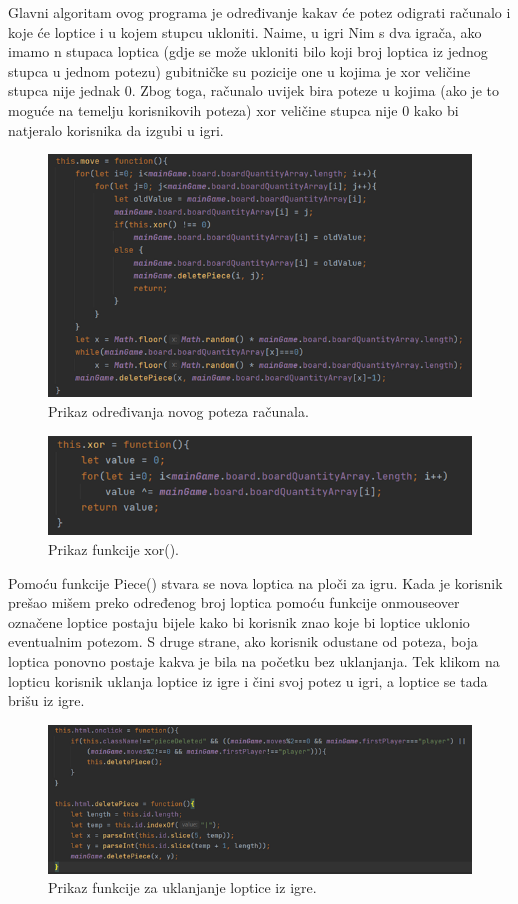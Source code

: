  


Glavni algoritam ovog programa je određivanje kakav će potez odigrati računalo i koje će loptice i u kojem stupcu ukloniti. Naime, u igri Nim s dva igrača, ako imamo n stupaca loptica (gdje se može ukloniti bilo koji broj loptica iz jednog stupca u jednom potezu) gubitničke su pozicije one u kojima je xor veličine stupca nije jednak 0. Zbog toga, računalo uvijek bira poteze u kojima (ako je to moguće na temelju korisnikovih poteza) xor veličine stupca nije 0 kako bi natjeralo korisnika da izgubi u igri.


\begin{figure}[H]
\centering
\includegraphics[width=14cm]{slike-kod/Slika11.png}
\caption{Prikaz određivanja novog poteza računala.}
\label{}
\end{figure}

\begin{figure}[H]
\centering
\includegraphics[width=14cm]{slike-kod/Slika12.png}
\caption{Prikaz funkcije xor().}
\label{}
\end{figure}





Pomoću funkcije Piece() stvara se nova loptica na ploči za igru. Kada je korisnik prešao mišem preko određenog broj loptica pomoću funkcije onmouseover označene loptice postaju bijele kako bi korisnik znao koje bi loptice uklonio eventualnim potezom. S druge strane, ako korisnik odustane od poteza, boja loptica ponovno postaje kakva je bila na početku bez uklanjanja. Tek klikom na lopticu korisnik uklanja loptice iz igre i čini svoj potez u igri, a loptice se tada brišu iz igre.


\begin{figure}[H]
\centering
\includegraphics[width=14cm]{slike-kod/Slika13.png}
\caption{Prikaz funkcije za uklanjanje loptice iz igre.}
\label{}
\end{figure}